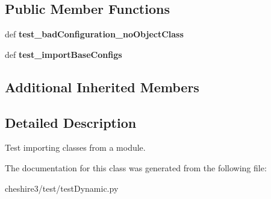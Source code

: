\subsection*{Public Member Functions}
\begin{DoxyCompactItemize}
\item 
\hypertarget{classcheshire3_1_1test_1_1test_dynamic_1_1_import_object_test_case_a3cf91a3343957fea09f94d6ca39d8c87}{def {\bfseries test\-\_\-bad\-Configuration\-\_\-no\-Object\-Class}}\label{classcheshire3_1_1test_1_1test_dynamic_1_1_import_object_test_case_a3cf91a3343957fea09f94d6ca39d8c87}

\item 
\hypertarget{classcheshire3_1_1test_1_1test_dynamic_1_1_import_object_test_case_a973aee6aebfef7e862baef03e6eb1c02}{def {\bfseries test\-\_\-import\-Base\-Configs}}\label{classcheshire3_1_1test_1_1test_dynamic_1_1_import_object_test_case_a973aee6aebfef7e862baef03e6eb1c02}

\end{DoxyCompactItemize}
\subsection*{Additional Inherited Members}


\subsection{Detailed Description}
\begin{DoxyVerb}Test importing classes from a module.\end{DoxyVerb}
 

The documentation for this class was generated from the following file\-:\begin{DoxyCompactItemize}
\item 
cheshire3/test/test\-Dynamic.\-py\end{DoxyCompactItemize}
